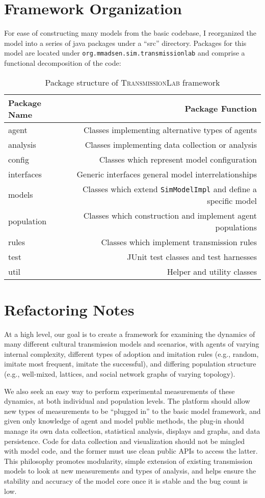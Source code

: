 \documentclass[noid]{kluwer-mem-proposal}
\newcommand{\tlfull}{\textsc{TransmissionLab}\xspace}
\begin{document}
\begin{article}
\section{Framework Organization}
For ease of constructing many models from the basic codebase, I reorganized the
model into a series of java packages under a ``src'' directory.  Packages for
this model are located under \texttt{org.mmadsen.sim.transmissionlab} and comprise
a functional decomposition of the code:\\
\begin{table}[ht]
\caption{Package structure of \tlfull framework}\label{table-tl-pkg}
\begin{tabular}{|l|r|}
\hline
Package Name&Package Function\\
\hline
agent&Classes implementing alternative types of agents\\
analysis&Classes implementing data collection or analysis\\
config&Classes which represent model configuration\\
interfaces&Generic interfaces general model interrelationships\\
models&Classes which extend \texttt{SimModelImpl} and define a specific model\\
population&Classes which construction and implement agent populations\\ 
rules&Classes which implement transmission rules\\
test&JUnit test classes and test harnesses \\
util&Helper and utility classes\\
\hline
\end{tabular}
\end{table}


\section{Refactoring Notes}
At a high level, our goal is to create a framework for examining the dynamics of
many different cultural transmission models and scenarios, with agents of
varying internal complexity, different types of adoption and imitation rules
(e.g., random, imitate most frequent, imitate the successful), and differing
population structure (e.g., well-mixed, lattices, and social network graphs of
varying topology).  

We also seek an easy way to perform experimental measurements of these dynamics,
at both individual and population levels.  The platform should allow new types
of measurements to be ``plugged in'' to the basic model framework, and given
only knowledge of agent and model public methods, the plug-in should manage its
own data collection, statistical analysis, displays and graphs, and data
persistence.  Code for data collection and visualization should not be mingled
with model code, and the former must use clean public APIs to access the latter.
This philosophy promotes modularity, simple extension of existing transmission
models to look at new measurements and types of analysis, and helps ensure the
stability and accuracy of the model core once it is stable and the bug count is
low. 

\end{article}
\end{document}
